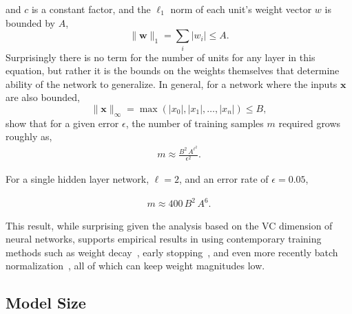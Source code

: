 \documentclass[thesis]{subfiles}
\begin{document}
    and $c$ is a constant factor, and the $\ell_1$ norm of each unit's weight vector $w$ is bounded by $A$, 
    \begin{equation}
    \|\mathbf{w}\|_1 = \sum_i | w_i | \leq A.
    \end{equation}
    Surprisingly there is no term for the number of units for any layer in this equation, but rather it is the bounds on the weights themselves that determine ability of the network to generalize. In general, for a network where the inputs $\mathbf{x}$ are also bounded,
    \begin{equation}
        \|\mathbf{x}\|_\infty = \max(|x_0|, |x_1|, \ldots, |x_n|) \leq B,
    \end{equation}
    \citet{bartlett1997} show that for a given error $\epsilon$, the number of training samples $m$ required grows roughly as,
    \begin{align}
        m \approx \frac{B^2\,A^{\ell^2}}{\epsilon^2}.
    \end{align}
    
     For a single hidden layer network, \ie $\ell=2$, and an error rate of $\epsilon=0.05$, 
    
    \begin{align}
        m \approx 400\,B^2\,A^6.
    \end{align}
    
    This result, while surprising given the analysis based on the VC dimension of neural networks, supports empirical results in using contemporary training methods such as weight decay~\citep{hinton1987learning}, early stopping~\citep{Bishop1995}, and even more recently batch normalization~\citep{Ioffe2015}, all of which can keep weight magnitudes low.
    
	
    \subsection{Model Size}
    
\end{document}
